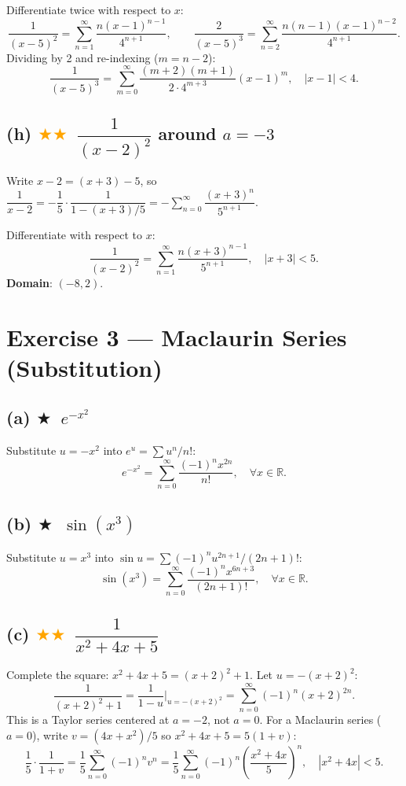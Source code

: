 \documentclass[12pt,a4paper]{article}
\newcommand{\easy}{\textcolor{green!60!black}{$\bigstar$}}
\newcommand{\medium}{\textcolor{orange}{$\bigstar\bigstar$}}
\begin{document}
Differentiate twice with respect to $x$:
\[
  \frac{1}{(x-5)^2} = \sum_{n=1}^{\infty}\frac{n(x-1)^{n-1}}{4^{n+1}},\qquad
  \frac{2}{(x-5)^3} = \sum_{n=2}^{\infty}\frac{n(n-1)(x-1)^{n-2}}{4^{n+1}}.
\]
Dividing by 2 and re-indexing ($m=n-2$):
\[
  \frac{1}{(x-5)^3} = \sum_{m=0}^{\infty}\frac{(m+2)(m+1)}{2\cdot 4^{m+3}}(x-1)^m, \quad |x-1|<4.
\]

\subsection*{(h) \medium\ $\dfrac{1}{(x-2)^2}$ around $a=-3$}

Write $x-2=(x+3)-5$, so $\dfrac{1}{x-2}=-\dfrac{1}{5}\cdot\dfrac{1}{1-(x+3)/5}=-\sum_{n=0}^{\infty}\dfrac{(x+3)^n}{5^{n+1}}$.

Differentiate with respect to $x$:
\[
  \frac{1}{(x-2)^2} = \sum_{n=1}^{\infty}\frac{n(x+3)^{n-1}}{5^{n+1}}, \quad |x+3|<5.
\]
\textbf{Domain}: $(-8, 2)$.

\section*{Exercise 3 — Maclaurin Series (Substitution)}

\subsection*{(a) \easy\ $e^{-x^2}$}
Substitute $u=-x^2$ into $e^u=\sum u^n/n!$:
\[
  e^{-x^2} = \sum_{n=0}^{\infty}\frac{(-1)^n x^{2n}}{n!}, \quad \forall x\in\mathbb{R}.
\]

\subsection*{(b) \easy\ $\sin(x^3)$}
Substitute $u=x^3$ into $\sin u=\sum(-1)^n u^{2n+1}/(2n+1)!$:
\[
  \sin(x^3) = \sum_{n=0}^{\infty}\frac{(-1)^n x^{6n+3}}{(2n+1)!}, \quad \forall x\in\mathbb{R}.
\]

\subsection*{(c) \medium\ $\dfrac{1}{x^2+4x+5}$}

Complete the square: $x^2+4x+5=(x+2)^2+1$.  Let $u=-(x+2)^2$:
\[
  \frac{1}{(x+2)^2+1} = \frac{1}{1-u}\Big|_{u=-(x+2)^2}
  = \sum_{n=0}^{\infty}(-1)^n(x+2)^{2n}.
\]
This is a Taylor series centered at $a=-2$, not $a=0$.  For a Maclaurin series ($a=0$), write $v=(4x+x^2)/5$ so $x^2+4x+5=5(1+v)$:
\[
  \frac{1}{5}\cdot\frac{1}{1+v} = \frac{1}{5}\sum_{n=0}^{\infty}(-1)^n v^n
  = \frac{1}{5}\sum_{n=0}^{\infty}(-1)^n\!\left(\frac{x^2+4x}{5}\right)^{\!n},
  \quad |x^2+4x|<5.
\]
\end{document}
